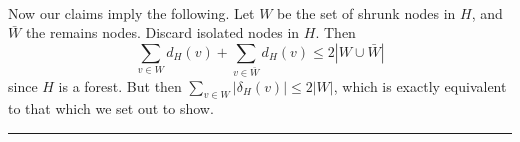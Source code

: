 \documentclass[letterpaper,12pt,oneside,onecolumn]{article}
\newenvironment{proof}{{\bf Proof:  }}{\hfill\rule{2mm}{2mm}}
\begin{document}
\begin{proof}
\paragraph{}
Now our claims imply the following. Let $W$ be the set of shrunk nodes in $H$, and $\bar{W}$ the remains nodes. Discard isolated nodes in $H$. Then
$$\sum_{v\in W} d_H(v) + \sum_{v\in\bar{W}}d_H(v) \leq 2|W \cup \bar{W}|$$
since $H$ is a forest. But then $\sum_{v\in W} |\delta_H(v)| \leq 2|W|$, which is exactly equivalent to that which we set out to show. 
\end{proof}
\end{document}
